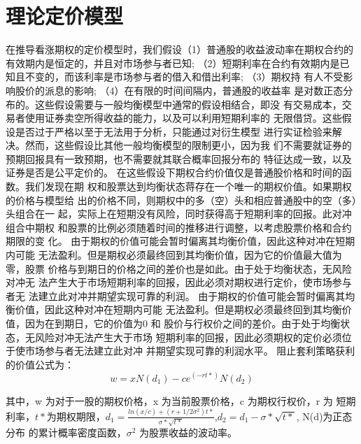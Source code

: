 \section{理论定价模型}
\par{
    在推导看涨期权的定价模型时，我们假设（1）普通股的收益波动率在期权合约的有效期内是恒定的，并且对市场参与者已知; （2）短期利率在合约有效期内是已知且不变的，而该利率是市场参与者的借入和借出利率; （3）期权持
    有人不受影响股价的派息的影响; （4）在有限的时间间隔内，普通股的收益率
    是对数正态分布的。这些假设需要与一般均衡模型中通常的假设相结合，即没
    有交易成本，交易者使用证券卖空所得收益的能力，以及可以利用短期利率的
    无限借贷。这些假设是否过于严格以至于无法用于分析，只能通过对衍生模型
    进行实证检验来解决。然而，这些假设比其他一般均衡模型的限制更小，因为我
    们不需要就证券的预期回报具有一致预期，也不需要就其联合概率回报分布的
    特征达成一致，以及证券是否是公平定价的。
    在这些假设下期权合约价值仅是普通股价格和时间的函数。我们发现在期
    权和股票达到均衡状态蒋存在一个唯一的期权价值。如果期权的价格与模型给
    出的价格不同，则期权中的多（空）头和相应普通股中的空（多）头组合在一
    起，实际上在短期没有风险，同时获得高于短期利率的回报。此对冲组合中期权
    和股票的比例必须随着时间的推移进行调整，以考虑股票价格和合约期限的变
    化。
    由于期权的价值可能会暂时偏离其均衡价值，因此这种对冲在短期内可能
    无法盈利。但是期权必须最终回到其均衡价值，因为它的价值最大值为零，股票
    价格与到期日的价格之间的差价也是如此。由于处于均衡状态，无风险对冲无
    法产生大于市场短期利率的回报，因此必须对期权进行定价，使市场参与者无
    法建立此对冲并期望实现可靠的利润。
    由于期权的价值可能会暂时偏离其均衡价值，因此这种对冲在短期内可能
    无法盈利。但是期权必须最终回到其均衡价值，因为在到期日，它的价值为0 和
    股价与行权价之间的差价。由于处于均衡状态，无风险对冲无法产生大于市场
    短期利率的回报，因此必须期权的定价必须位于使市场参与者无法建立此对冲
    并期望实现可靠的利润水平。
    阻止套利策略获利的价值公式为：
}
\begin{equation}
    w=xN(d_1)-ce^(-rt*)N(d_2)
\end{equation}
\par{
    其中，w 为对于一股的期权价格，x 为当前股票价格，c 为期权行权价，r 为
短期利率，$t*$为期权期限，$d_1=\frac{ln(x/c)+(r+1/2\sigma^2)t*}{\sigma*{\sqrt{t*}}}$,$d_2=d_1-\sigma*\sqrt{t*}$,
N(d)为正态分布
的累计概率密度函数，$\sigma^2$ 为股票收益的波动率。
}
